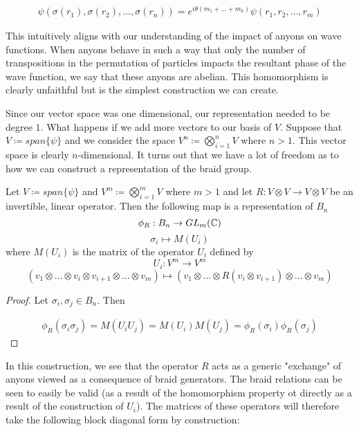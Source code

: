 \begin{equation}
	\begin{aligned}
		\psi(\sigma(r_1),\sigma(r_2),\hdots,\sigma(r_n)) = e^{i\theta(m_1+\hdots+m_k)} \psi(r_1,r_2,\hdots,r_m)
	\end{aligned}
\end{equation}

This intuitively aligns with our understanding of the impact of anyons on wave functions. When anyons behave in such a way that only the number of transpositions in the permutation of particles impacts the resultant phase of the wave function, we say that these anyons are abelian. This homomorphism is clearly unfaithful but is the simplest construction we can create.

Since our vector space was one dimensional, our representation needed to be degree $1$. What happens if we add more vectors to our basis of $V$. Suppose that $V \coloneq span\{\psi\}$ and we consider the space $V^n\coloneq\bigotimes_{i=1}^nV$ where $n>1$. This vector space is clearly $n$-dimensional. It turns out that we have a lot of freedom as to how we can construct a representation of the braid group.

\begin{theorem}\cite{Riverside} 
	Let $V \coloneq span\{\psi\}$ and  $V^m\coloneq\bigotimes_{i=1}^mV$ where $m>1$ and let $R: V\otimes V \rightarrow V\otimes V $ be an invertible, linear operator. Then the following map is a representation of $B_n$
$$\phi_R:B_n\rightarrow GL_m(\mathbb{C})$$
$$\sigma_i \mapsto M(U_i)$$
where $M(U_i)$ is the matrix of the operator $U_i$ defined by
$$U_i:V^m\rightarrow V^m$$
$$(v_1\otimes\hdots\otimes v_i\otimes v_{i+1}\otimes\hdots\otimes v_m)\mapsto (v_1\otimes\hdots\otimes R(v_i\otimes v_{i+1})\otimes\hdots\otimes v_m)$$
\end{theorem}

\noindent \begin{proof} Let $\sigma_i,\sigma_j\in B_n$. Then

\begin{equation}
	\begin{aligned}
		\phi_R(\sigma_i\sigma_j) = M(U_iU_j) = M(U_i)M(U_j) =  \phi_R(\sigma_i)\phi_R(\sigma_j)
	\end{aligned}
\end{equation}
 \end{proof}

In this construction, we see that the operator $R$ acts as a generic "exchange" of anyons viewed as a consequence of braid generators. The braid relations can be seen to easily be valid (as a result of the homomorphism property ot directly as a result of the construction of $U_i$). The matrices of these operators will therefore take the following block diagonal form by construction:

